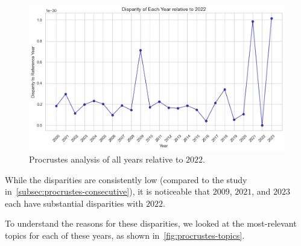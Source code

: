 \begin{figure}[h]
  \centering
  \includegraphics[width=\textwidth]{figures/procrustes/procrustes-2022.png}
  \caption{Procrustes analysis of all years relative to $2022$.}
  \label{fig:procrustes-2022}
\end{figure}

While the disparities are consistently low (compared to the study in~\cref{subsec:procrustes-consecutive}),
it is noticeable that $2009$, $2021$, and $2023$ each have substantial disparities with $2022$.

To understand the reasons for these disparities, we looked at the most-relevant topics
for each of these years, as shown in~\cref{fig:procrustes-topics}.

